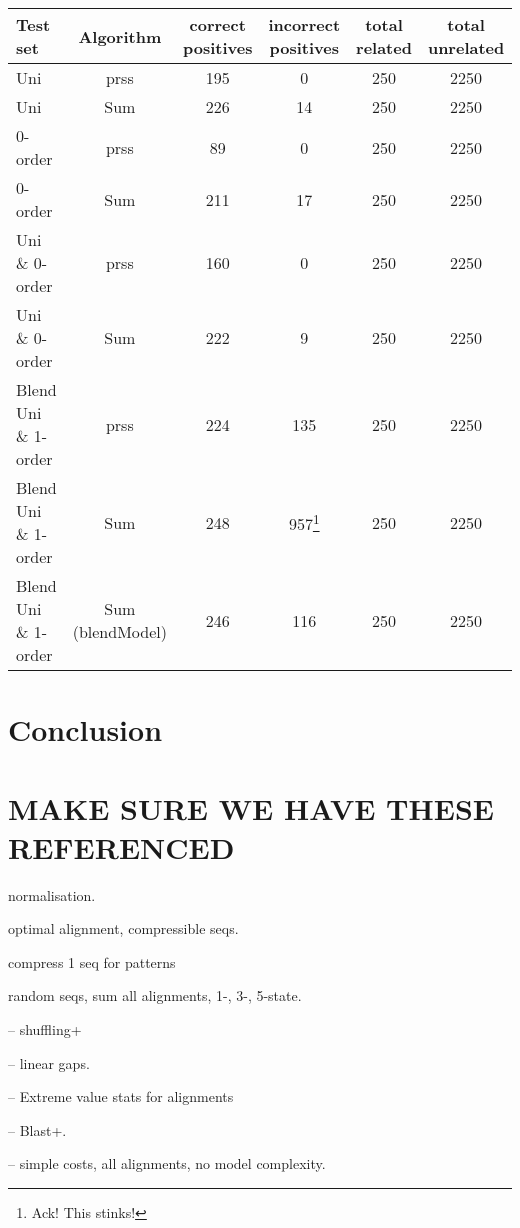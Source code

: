 \documentclass[letterpaper,11pt,oneside]{article}
\begin{document}
\begin{minipage}{\textwidth}
\small
\begin{tabular}{|l|c||c|c||c|c|} \hline
Test set & Algorithm & correct positives & incorrect positives & total related & total unrelated \\ \hline
Uni &  prss & 195 & 0 & 250 & 2250 \\ 
Uni & Sum & 226 & 14 & 250 & 2250 \\ \hline

0-order & prss & 89 & 0 & 250 & 2250 \\ 
0-order & Sum & 211 & 17 & 250 & 2250 \\ \hline

Uni \& 0-order & prss & 160 & 0 & 250 & 2250 \\ 
Uni \& 0-order & Sum & 222 & 9 & 250 & 2250 \\  \hline

Blend Uni \& 1-order & prss & 224 & 135 & 250 & 2250 \\ 
Blend Uni \& 1-order & Sum & 248 & 957\footnote{Ack! This stinks!} & 250 & 2250 \\ 
Blend Uni \& 1-order & Sum (blendModel) & 246 & 116 & 250 & 2250 \\ 
\hline \end{tabular}
\end{minipage}

\section{Conclusion}
\label{sec:conc}

\section{MAKE SURE WE HAVE THESE REFERENCED} 
normalisation.\cite{allison93a}

optimal alignment, compressible seqs.\cite{allison99}

compress 1 seq for patterns \cite{allison00a}

random seqs, sum all alignments, 1-, 3-, 5-state. \cite{allison92a}

-- shuffling+ \cite{altschul85}

-- linear gaps. \cite{altschul86}

-- Extreme value stats for alignments \cite{karlin90}

-- Blast+. \cite{altschul97}

-- simple costs, all alignments, no model complexity. \cite{bishop86}
\end{document}
